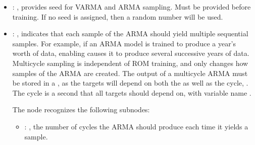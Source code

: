 \begin{itemize}
    \item {}: , 
      provides seed for VARMA and ARMA sampling.
      Must be provided before training. If no seed is assigned,
      then a random number will be used.

    \item {}: , 
      indicates that each sample of the ARMA should yield
      multiple sequential samples. For example, if an ARMA model is trained to produce a year's
      worth of data,                                                    enabling
       causes it to produce several successive years of data. Multicycle
      sampling                                                    is independent of ROM training,
      and only changes how samples of the ARMA are created.
      \nb The output of a multicycle ARMA must be stored in a , as the targets will
      depend                                                    on both the 
      as well as the cycle, . The cycle is a second
       that all targets should depend on, with variable name .

      The  node recognizes the following subnodes:
      \begin{itemize}
        \item {}: , 
          the number of cycles the ARMA should produce
          each time it yields a sample.


\end{itemize}
\end{itemize}

